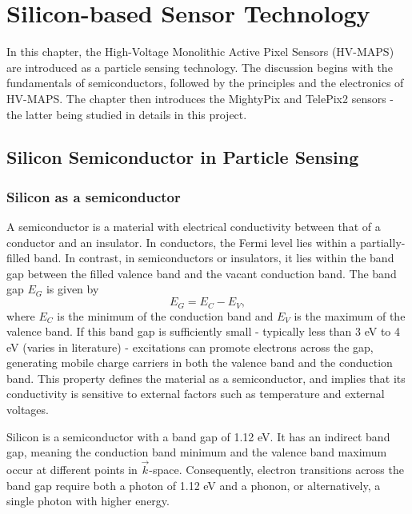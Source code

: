 \chapter{Silicon-based Sensor Technology}
\graphicspath{{3_Theory/Figs/}}

In this chapter, the High-Voltage Monolithic Active Pixel Sensors (HV-MAPS) are introduced as a particle sensing technology. The discussion begins with the fundamentals of semiconductors, followed by the principles and the electronics of HV-MAPS. The chapter then introduces the MightyPix and TelePix2 sensors - the latter being studied in details in this project.


\section{Silicon Semiconductor in Particle Sensing} 
\label{section3.1}

\subsection{Silicon as a semiconductor}
A semiconductor is a material with electrical conductivity between that of a conductor and an insulator. In conductors, the Fermi level lies within a partially-filled band. In contrast, in semiconductors or insulators, it lies within the band gap between the filled valence band and the vacant conduction band. The band gap $E_G$ is given by
\begin{equation}
    E_G=E_C-E_V,
    \label{eq:bandgap}
\end{equation}
where $E_C$ is the minimum of the conduction band and $E_V$ is the maximum of the valence band. If this band gap is sufficiently small - typically less than 3 eV to 4 eV (varies in literature) - excitations can promote electrons across the gap, generating mobile charge carriers in both the valence band and the conduction band. This property defines the material as a semiconductor, and implies that its conductivity is sensitive to external factors such as temperature and external voltages. 

Silicon is a semiconductor with a band gap of 1.12 eV. It has an indirect band gap, meaning the conduction band minimum and the valence band maximum occur at different points in $\vec{k}$-space. Consequently, electron transitions across the band gap require both a photon of 1.12 eV and a phonon, or alternatively, a single photon with higher energy.


